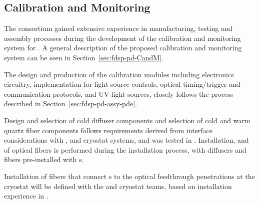 \subsection{Calibration and Monitoring}
\label{sec:fdsp-pd-assy-CandM}

The consortium gained extensive experience in manufacturing, testing and assembly processes %
during the development of the calibration and monitoring system for .
A general description of the proposed calibration and monitoring system can be seen in  Section~\ref{sec:fdsp-pd-CandM}. 

The design and production of the calibration modules including electronics circuitry,   implementation for light-source controls, optical timing/trigger and  communication protocols, and UV light sources, closely follows the process described in Section~\ref{sec:fdsp-pd-assy-pde}.

Design and selection of cold diffuser components and selection of cold and warm quartz fiber components follows requirements derived from interface considerations with ,   and cryostat systems, %
and was tested in .
Installation,  and  of optical fibers is performed during the  installation process, with diffusers and  fibers pre-installed with s.

Installation of fibers that connect s %
to the optical feedthrough penetrations at the cryostat will be defined with the  and cryostat teams, based on installation experience in . 